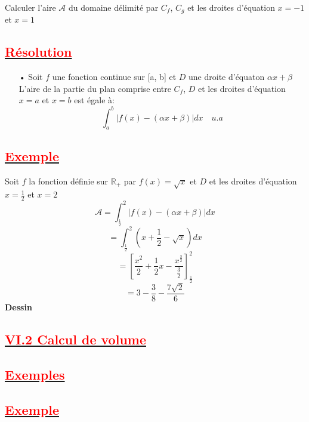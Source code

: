 \documentclass[12pt]{article}
\begin{document}
Calculer l'aire $\mathcal{A}$ du domaine délimité par $C_{f}$, $C_{g}$ et les droites d'équation $x=-1$ et $x=1$
\subsection*{\underline{\textbf{\textcolor{red}{Résolution}}}}
\begin{itemize}
\item[•] Soit $f$ une fonction continue sur [a, b] et $D$ une droite d'équaton 
$\alpha x+\beta$
L'aire de la partie du plan comprise entre $C_{f}$, $D$  et les droites d'équation  
$x=a$ et $x=b$ est égale à:
\[\int_{a}^{b}|f(x)-(\alpha x+\beta)|dx\quad u.a\]
\end{itemize}
\subsection*{\underline{\textbf{\textcolor{red}{Exemple }}}}
Soit $f$ la fonction définie sur $\mathbb{R}_{+}$ par $f(x)=\sqrt{x}$ et $D$ et les droites d'équation $x=\frac{1}{2}$ et $x=2$ 
\[\mathcal{A}=\int_{\frac{1}{2}}^{2}|f(x)-(\alpha x+\beta)|dx\]
\[=\int_{\frac{1}{2}}^{2}(x+\frac{1}{2}-\sqrt{x})dx\]
\[= \left[ \frac{x^{2}}{2}+\frac{1}{2}x-\frac{x^{\frac{3}{2}}}{\frac{3}{2}} \right]_{\frac{1}{2}}^{2}  \]
\[=3-\frac{3}{8}-\frac{7\sqrt{2}}{6}\]
\textbf{Dessin}
\subsection*{\underline{\textbf{\textcolor{red}{VI.2 Calcul de volume}}}}
\subsection*{\underline{\textbf{\textcolor{red}{Exemples}}}}
\subsection*{\underline{\textbf{\textcolor{red}{Exemple }}}}
\end{document}
